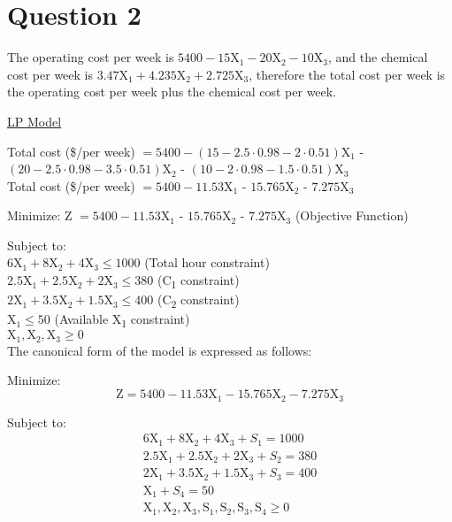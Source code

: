 \section*{Question 2}

The operating cost per week is $5400 - 15$X$_1 - 20$X$_2 - 10$X$_3$, and the chemical cost per week is $3.47$X$_1 + 4.235$X$_2 + 2.725$X$_3$, therefore the total cost per week is the operating cost per week plus the chemical cost per week.

\underline{LP Model}

Total cost (\$/per week) $ = 5400 - (15 - 2.5\cdot0.98 - 2\cdot0.51)$X$_1$ - $(20 - 2.5\cdot0.98 - 3.5\cdot0.51)$X$_2$ - $(10 - 2\cdot0.98 - 1.5\cdot0.51)$X$_3$ \\
Total cost (\$/per week) $ = 5400 - 11.53$X$_1$ - $15.765$X$_2$ - $7.275$X$_3$

Minimize: Z $ = 5400 - 11.53$X$_1$ - $15.765$X$_2$ - $7.275$X$_3$ (Objective Function)

Subject to:\\
$6\text{X}_1 + 8\text{X}_2 + 4\text{X}_3 \leq 1000$ (Total hour constraint) \\
$2.5\text{X}_1 + 2.5\text{X}_2 + 2\text{X}_3 \leq 380$ (C\textsubscript{1} constraint) \\
$2\text{X}_1 + 3.5\text{X}_2 + 1.5\text{X}_3 \leq 400 $ (C\textsubscript{2} constraint) \\
$\text{X}_1 \leq 50$ (Available X\textsubscript{1} constraint) \\
$\text{X}_1, \text{X}_2, \text{X}_3 \geq 0$ \\


The canonical form of the model is expressed as follows:

Minimize:
\begin{equation*}
	\text{Z} = 5400 - 11.53\text{X}_1 - 15.765\text{X}_2 - 7.275\text{X}_3
\end{equation*}

Subject to:
\begin{gather*}
	6\text{X}_1 + 8\text{X}_2 + 4\text{X}_3 + S_1 = 1000 \\
	2.5\text{X}_1 + 2.5\text{X}_2 + 2\text{X}_3 + S_2 = 380 \\
	2\text{X}_1 + 3.5\text{X}_2 + 1.5\text{X}_3 + S_3 = 400 \\
	\text{X}_1 + S_4 = 50 \\
	\text{X}_1, \text{X}_2, \text{X}_3, \text{S}_1, \text{S}_2, \text{S}_3, \text{S}_4 \geq 0
\end{gather*}

